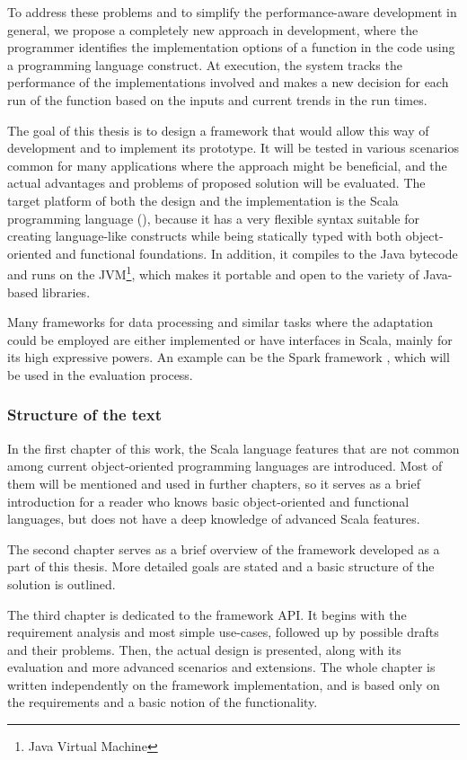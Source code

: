 To address these problems and to simplify the performance-aware development in general, we propose a completely new approach in development, where the programmer identifies the implementation options of a function in the code using a programming language construct. At execution, the system tracks the performance of the implementations involved and makes a new decision for each run of the function based on the inputs and current trends in the run times.

The goal of this thesis is to design a framework that would allow this way of development and to implement its prototype. It will be tested in various scenarios common for many applications where the approach might be beneficial, and the actual advantages and problems of proposed solution will be evaluated. The target platform of both the design and the implementation is the Scala programming language (\cite{noauthor_scala_nodate}), because it has a very flexible syntax suitable for creating language-like constructs while being statically typed with both object-oriented and functional foundations. In addition, it compiles to the Java bytecode and runs on the JVM\footnote{Java Virtual Machine}, which makes it portable and open to the variety of \mbox{Java-based} libraries. 

Many frameworks for data processing and similar tasks where the adaptation could be employed are either implemented or have interfaces in Scala, mainly for its high expressive powers. An example can be the Spark framework \cite{noauthor_apache_nodate}, which will be used in the evaluation process.

\subsubsection{Structure of the text}

In the first chapter of this work, the Scala language features that are not common among current object-oriented programming languages are introduced. Most of them will be mentioned and used in further chapters, so it serves as a brief introduction for a reader who knows basic object-oriented and functional languages, but does not have a deep knowledge of advanced Scala features.

The second chapter serves as a brief overview of the framework developed as a part of this thesis. More detailed goals are stated and a basic structure of the solution is outlined.

The third chapter is dedicated to the framework API. It begins with the requirement analysis and most simple use-cases, followed up by possible drafts and their problems. Then, the actual design is presented, along with its evaluation and more advanced scenarios and extensions. The whole chapter is written independently on the framework implementation, and is based only on the requirements and a basic notion of the functionality.

